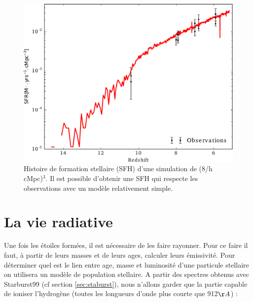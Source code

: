 \begin{figure}
        \includegraphics[width=.95\linewidth]{img/02/SFR.pdf}
        \caption[Histoire de formation stellaire]{Histoire de formation stellaire (SFH) d'une simulation de (8/h cMpc)$^3$.
        Il est possible d'obtenir une SFH qui respecte les observations avec un modèle relativement simple.
}
 		\label{fig:test_SFH}
\end{figure}



\clearpage
\section{La vie radiative}
\label{sec:etoilerad}


Une fois les étoiles formées, il est nécessaire de les faire rayonner.
Pour ce faire il faut, à partir de leurs masses et de leurs ages, calculer leurs émissivité.
Pour déterminer quel est le lien entre age, masse et luminosité d'une particule stellaire on utilisera un modèle de population stellaire.
A partir des spectres obtenus avec Starburst99 (cf section \ref{sec:staburst}), nous n'allons garder que la partie capable de ioniser l'hydrogène (toutes les longueurs d'onde plus courte que 912$\AA$) :

